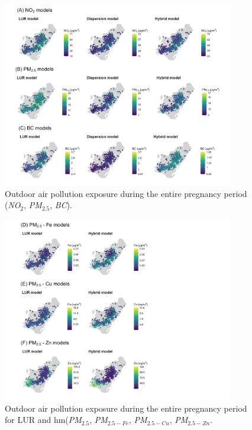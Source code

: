 \documentclass{article}
\begin{document}
\captionsetup[figure]{skip=6pt}
\begin{figure}[!htb]
\includegraphics[width=0.9\textwidth]{figures/combined_figure1.png}
\caption{Outdoor air pollution exposure during the entire pregnancy period (\textit{NO$_2$}, \textit{PM$_{2.5}$}, \textit{BC}).}
\label{fig2a}
\end{figure}

\captionsetup[figure]{skip=6pt}
\begin{figure}[!htb]
\includegraphics[width=0.9\textwidth]{figures/combined_figure2.png}
\caption{Outdoor air pollution exposure during the entire pregnancy period for LUR and hm(\textit{PM$_{2.5}$}, \textit{PM$_{2.5-Fe}$}, \textit{PM$_{2.5-Cu}$}, \textit{PM$_{2.5-Zn}$}.}
\label{fig2b}
\end{figure}
\end{document}
